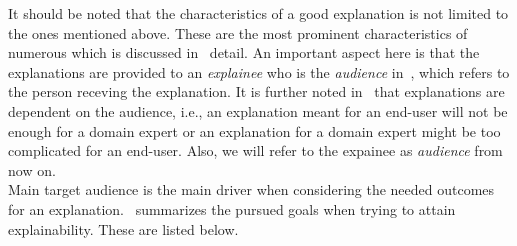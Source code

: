 It should be noted that the characteristics of a good explanation is not limited to the ones mentioned above. These are the most prominent characteristics of numerous which is discussed in~\parencite{ExplanationInAI_Miller} detail. An important aspect here is that the explanations are provided to an \emph{explainee} who is the \emph{audience} in~\parencite{XAIConceptsTaxonomies_Arrieta}, which refers to the person receving the explanation. It is further noted in~\parencite{XAIConceptsTaxonomies_Arrieta} that explanations are dependent on the audience, i.e., an explanation meant for an end-user will not be enough for a domain expert or an explanation for a domain expert might be too complicated for an end-user. Also, we will refer to the expainee as \emph{audience} from now on.\\
Main target audience is the main driver when considering the needed outcomes for an explanation.~\cite{XAIConceptsTaxonomies_Arrieta} summarizes the pursued goals when trying to attain explainability. These are listed below.
